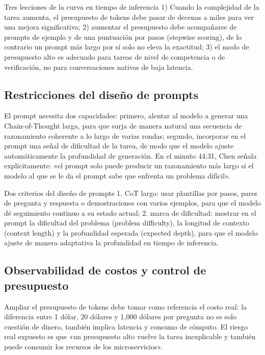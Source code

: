 \documentclass[a4paper]{article}
\begin{document}
\begin{importantbox}{Tres lecciones de la curva en tiempo de inferencia}
1) Cuando la complejidad de la tarea aumenta, el presupuesto de tokens debe pasar de decenas a miles para ver una mejora significativa; 2) aumentar el presupuesto debe acompañarse de prompts de ejemplo y de una puntuación por pasos (stepwise scoring), de lo contrario un prompt más largo por sí solo no eleva la exactitud; 3) el modo de presupuesto alto es adecuado para tareas de nivel de competencia o de verificación, no para conversaciones nativas de baja latencia.
\end{importantbox}

\subsection{Restricciones del diseño de prompts}
El prompt necesita dos capacidades: primero, alentar al modelo a generar una Chain-of-Thought larga, para que surja de manera natural una secuencia de razonamiento coherente a lo largo de varias rondas; segundo, incorporar en el prompt una señal de dificultad de la tarea, de modo que el modelo ajuste automáticamente la profundidad de generación. En el minuto 44:31, Chen señala explícitamente: «el prompt solo puede producir un razonamiento más largo si el modelo al que se le da el prompt sabe que enfrenta un problema difícil».

\begin{knowledgebox}{Dos criterios del diseño de prompts}
1. CoT largo: usar plantillas por pasos, pares de pregunta y respuesta o demostraciones con varios ejemplos, para que el modelo dé seguimiento continuo a su estado actual; 2. marca de dificultad: mostrar en el prompt la dificultad del problema (problem difficulty), la longitud de contexto (context length) y la profundidad esperada (expected depth), para que el modelo ajuste de manera adaptativa la profundidad en tiempo de inferencia.
\end{knowledgebox}

\subsection{Observabilidad de costos y control de presupuesto}
Ampliar el presupuesto de tokens debe tomar como referencia el costo real: la diferencia entre 1 dólar, 20 dólares y 1,000 dólares por pregunta no es solo cuestión de dinero, también implica latencia y consumo de cómputo. El riesgo real expuesto es que «un presupuesto alto vuelve la tarea inexplicable y también puede consumir los recursos de los microservicios».
\end{document}
